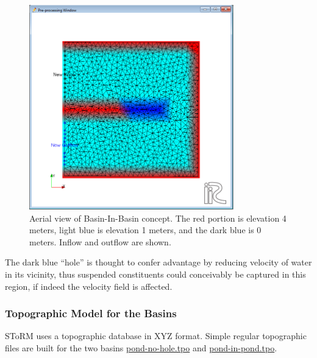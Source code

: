 \documentclass[12pt]{article}
\begin{document}
\begin{figure}[h!] %
   \centering
   \includegraphics[height=3.5in]{BasinInBasin.png} 
   \caption{Aerial view of Basin-In-Basin concept.   The red portion is elevation 4 meters, light blue is elevation 1 meters, and the dark blue is 0 meters. Inflow and outflow are shown.}
   \label{fig:BasinInBasin}
\end{figure}

The dark blue ``hole'' is thought to confer advantage by reducing velocity of water in its vicinity, thus suspended constituents could conceivably be captured in this region, if indeed the velocity field is affected.  

\subsubsection*{Topographic Model for the Basins}
SToRM uses a topographic database in XYZ format.   Simple regular topographic files are built for the two basins \url{pond-no-hole.tpo} and \url{pond-in-pond.tpo}.
\end{document}
